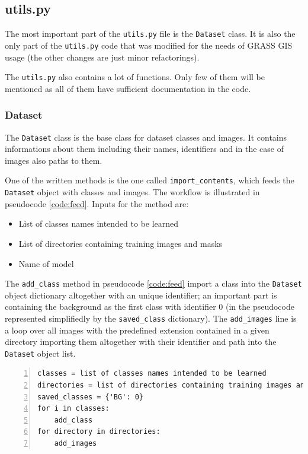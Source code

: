 \subsection{utils.py}
\label{utils}

The most important part of the \verb|utils.py| file is the \verb|Dataset| class. 
It is also the only part of the \verb|utils.py| code that was modified for the 
needs of GRASS GIS usage (the other changes are just minor refactorings).

The \verb|utils.py| also contains a lot of functions. Only few of them will be 
mentioned as all of them have sufficient documentation in the code.

\subsubsection{Dataset}
\label{dataset}

The \verb|Dataset| class is the base class for dataset classes and images. It 
contains informations about them including their names, identifiers and in the 
case of images also paths to them.

One of the written methods is the one called \verb|import_contents|, which feeds 
the \verb|Dataset| object with classes and images. The workflow is illustrated 
in pseudocode \ref{code:feed}. Inputs for the method are:
\begin{itemize}
	\item List of classes names intended to be learned
	\item List of directories containing training images and masks
	\item Name of model
\end{itemize}

The \verb|add_class| method in pseudocode \ref{code:feed} import a class into 
the \verb|Dataset| object dictionary altogether with an unique identifier; an 
important part is containing the background as the first class with identifier 0 
(in the pseudocode represented simplifiedly by the \verb|saved_class| 
dictionary). The \verb|add_images| line is a loop over all images with the 
predefined extension contained in a given directory importing them altogether 
with their identifier and path into the \verb|Dataset| object list. 

{\scriptsize
\begin{lstlisting}[style=python, caption={import\_contents}, captionpos=b, 
label=code:feed, deletekeywords={and},
backgroundcolor = \color{light-gray}, numbers=left, breaklines=true]
classes = list of classes names intended to be learned
directories = list of directories containing training images and masks
saved_classes = {'BG': 0}
for i in classes:
    add_class
for directory in directories:
    add_images
\end{lstlisting}}

